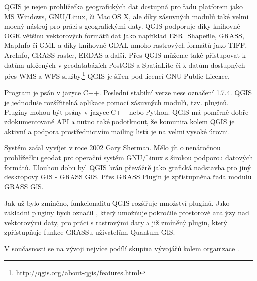 QGIS je nejen prohlížečka geografických dat dostupná pro řadu platforem jako MS Windows, GNU/Linux, či Mac OS X, ale díky zásuvných modulů také velmi mocný nástroj pro práci s geografickými daty. QGIS podporuje díky knihovně OGR většinu vektorových formátů dat jako například ESRI Shapefile, GRASS, MapInfo či GML a díky knihovně  GDAL mnoho rastrových formátů jako TIFF, ArcInfo, GRASS raster, ERDAS a další. Přes QGIS můžeme také přistupovat k datům uložených v geodatabázích PostGIS a SpatiaLite či k datům dostupných přes WMS a WFS služby.\footnote{http://qgis.org/about-qgis/features.html} QGIS je šířen pod licencí GNU Public Licence.

Program je psán v jazyce C++. Poslední stabilní verze nese označení 1.7.4. QGIS je jednoduše rozšířitelná aplikace pomocí zásuvných modulů, tzv. pluginů. Pluginy mohou být psány v jazyce C++ nebo Python. QGIS má poměrně dobře zdokumentované API a nutno také podotknout, že komunita kolem QGIS je aktivní a podpora prostřednictvím mailing listů je na velmi vysoké úrovni.

Systém začal vyvíjet v roce 2002 Gary Sherman. Mělo jít o nenáročnou prohlížečku geodat pro operační systém GNU/Linux s širokou podporou datových formátů. Dlouhou dobu byl QGIS brán převážně jako grafická nadstavba pro jiný desktopový GIS - GRASS GIS. Přes GRASS Plugin je zpřístupněna řada modulů GRASS GIS. 

Jak už bylo zmíněno, funkcionalitu QGIS rozšiřuje množství pluginů. Jako základní pluginy bych označil  , který umožňuje pokročilé prostorové analýzy nad vektorovými daty,   pro práci s rastrovými daty a již zmíněný   plugin, který zpřístupňuje funkce GRASSu uživatelům Quantum GIS. 

V současnosti se na vývoji nejvíce podílí skupina vývojářů kolem organizace .

